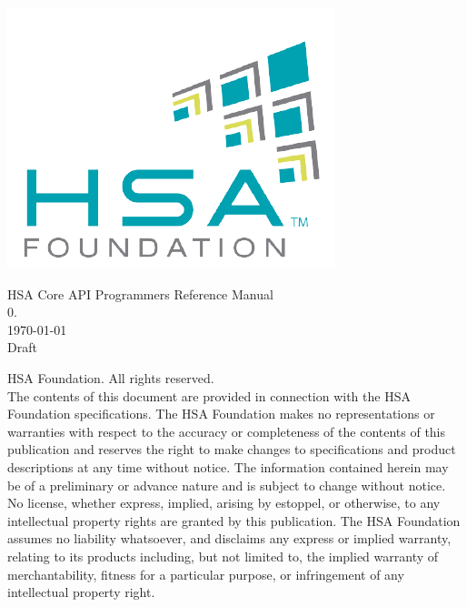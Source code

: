 \documentclass{book}
\begin{document}
\hypersetup{pageanchor=false,citecolor=blue}
\begin{titlepage}
\includegraphics[width=.5\textwidth]{fig/foundation.png}
\vspace*{7cm}
\begin{center}
{\Large HSA Core API Programmers Reference Manual\\[1ex]\large
0. }\\
\vspace*{1cm}
\vspace*{0.5cm}
{\small \today}\\
\vspace*{0.5cm}
{\small Draft}\\
\end{center}
\end{titlepage}
\thispagestyle{empty}
{ HSA Foundation. All rights reserved.\\}
The contents of this document are provided in connection with the
HSA Foundation specifications. The HSA Foundation makes no
representations or warranties with respect to the accuracy or
completeness of the contents of this publication and reserves the
right to make changes to specifications and product descriptions at
any time without notice. The information contained herein may be of
a preliminary or advance nature and is subject to change without
notice. No license, whether express, implied, arising by estoppel,
or otherwise, to any intellectual property rights are granted by
this publication. The HSA Foundation assumes no liability
whatsoever, and disclaims any express or implied warranty, relating
to its products including, but not limited to, the implied warranty
of merchantability, fitness for a particular purpose, or
infringement of any intellectual property right.
\clearpage
{}
\tableofcontents
{}
\clearpage

\setcounter{page}{1}
\end{document}
